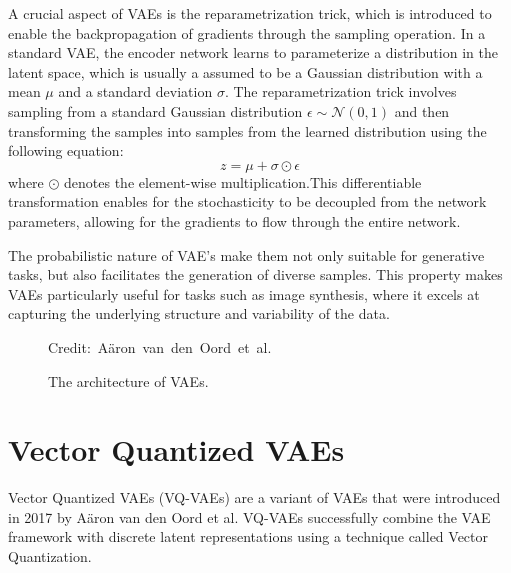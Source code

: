 A crucial aspect of VAEs is the reparametrization trick, which is introduced to enable the backpropagation of gradients through the sampling operation. In a standard VAE, the encoder network learns to parameterize a distribution in the latent space, which is usually a assumed to be a Gaussian distribution with a mean $\mu$ and a standard deviation $\sigma$. The reparametrization trick involves sampling from a standard Gaussian distribution $\epsilon \sim \mathcal{N}(0,1)$ and then transforming the samples into samples from the learned distribution using the following equation: \[ z = \mu + \sigma \odot \epsilon \] where $\odot$ denotes the element-wise multiplication\cite{kingma2022autoencoding}.This differentiable transformation enables for the stochasticity to be decoupled from the network parameters, allowing for the gradients to flow through the entire network.

The probabilistic nature of VAE's make them not only suitable for generative tasks, but also facilitates the generation of diverse samples. This property makes VAEs particularly useful for tasks such as image synthesis, where it excels at capturing the underlying structure and variability of the data\cite{Kingma_2019}.

\begin{figure}[H]
    \centering

    \caption{ The architecture of VAEs.}
  	\medskip 
	\hspace*{15pt}\hbox{\scriptsize Credit: Aäron van den Oord et al.}
    \label{VAEFigure}

\end{figure}

\section{Vector Quantized VAEs}

Vector Quantized VAEs (VQ-VAEs) are a variant of VAEs that were introduced in 2017 by Aäron van den Oord et al\cite{vqvae}. VQ-VAEs successfully combine the VAE framework with discrete latent representations using a technique called Vector Quantization. 

